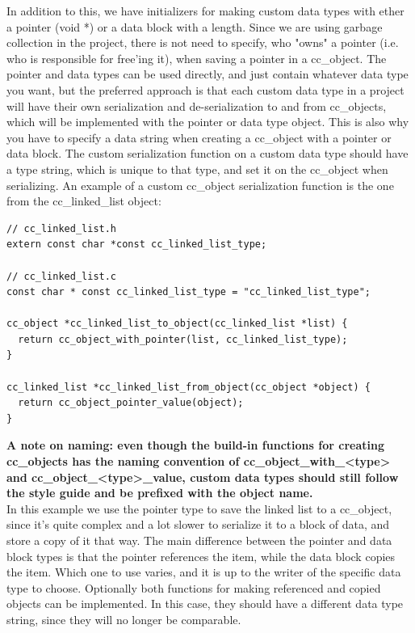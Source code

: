 \documentclass[table]{ituthesis}
\begin{document}
In addition to this, we have initializers for making custom data types with ether a pointer (void *) or a data block with a length. Since we are using garbage collection in the project, there is not need to specify, who "owns" a pointer (i.e. who is responsible for free'ing it), when saving a pointer in a cc\_object. The pointer and data types can be used directly, and just contain whatever data type you want, but the preferred approach is that each custom data type in a project will have their own serialization and de-serialization to and from cc\_objects, which will be implemented with the pointer or data type object. This is also why you have to specify a data string when creating a cc\_object with a pointer or data block. The custom serialization function on a custom data type should have a type string, which is unique to that type, and set it on the cc\_object when serializing. An example of a custom cc\_object serialization function is the one from the cc\_linked\_list object:

\begin{lstlisting}[label=custom-serialization,caption=Example of how to implement custom serialization]
// cc_linked_list.h
extern const char *const cc_linked_list_type;

// cc_linked_list.c
const char * const cc_linked_list_type = "cc_linked_list_type";

cc_object *cc_linked_list_to_object(cc_linked_list *list) {
  return cc_object_with_pointer(list, cc_linked_list_type);
}

cc_linked_list *cc_linked_list_from_object(cc_object *object) {
  return cc_object_pointer_value(object);
}
\end{lstlisting}

\textbf{A note on naming: even though the build-in functions for creating cc\_objects has the naming convention of cc\_object\_with\_<type> and cc\_object\_<type>\_value, custom data types should still follow the style guide and be prefixed with the object name.}\\

In this example we use the pointer type to save the linked list to a cc\_object, since it's quite complex and a lot slower to serialize it to a block of data, and store a copy of it that way. The main difference between the pointer and data block types is that the pointer references the item, while the data block copies the item. Which one to use varies, and it is up to the writer of the specific data type to choose. Optionally both functions for making referenced and copied objects can be implemented. In this case, they should have a different data type string, since they will no longer be comparable.
\end{document}
